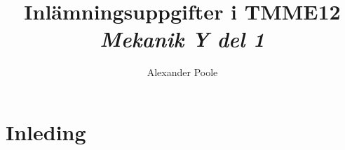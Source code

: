 \documentclass[a4paper,12pt]{article}
\title{Inlämningsuppgifter i TMME12\\ \emph{Mekanik Y del 1}}
\author{Alexander Poole}
\begin{document}


\section{Inleding}
\end{document}
